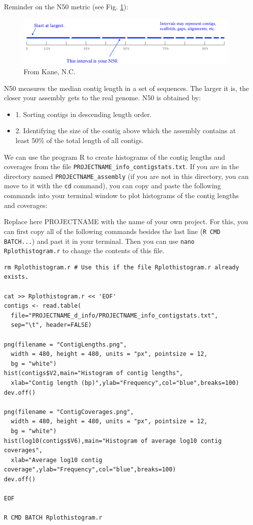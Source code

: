 \documentclass[11pt]{article}
\begin{document}
Reminder on the N50 metric (see Fig. \ref{fig:N50}):


\begin{figure}[htb]
\centering
\includegraphics[width=11cm]{N50.png}
\caption{\label{fig:N50}From Kane, N.C.}
\end{figure}


N50 measures the median contig length in a set of sequences. The
larger it is, the closer your assembly gets to the real genome. N50 is
obtained by:
\begin{itemize}
\item 1. Sorting contigs in descending length order.
\item 2. Identifying the size of the contig above which the assembly contains at least 50\% of the
total length of all contigs.
\end{itemize}


We can use the program R to create histograms of the contig lengths
and coverages from the file
\texttt{PROJECTNAME\_info\_contigstats.txt}. If you are in the
directory named \texttt{PROJECTNAME\_assembly} (if you are not in
this directory, you can move to it with the \texttt{cd} command), you can
copy and paste the following commands into your terminal window to
plot histograms of the contig lengths and coverages:

Replace here PROJECTNAME with the name of your own project. For this,
you can first copy all of the following commands besides the last line
(\texttt{R CMD BATCH...}) and past it in your terminal. Then you can use
\texttt{nano Rplothistogram.r} to change the contents of this file.

\begin{verbatim}
rm Rplothistogram.r # Use this if the file Rplothistogram.r already exists.

cat >> Rplothistogram.r << 'EOF'
contigs <- read.table(
  file="PROJECTNAME_d_info/PROJECTNAME_info_contigstats.txt", 
  sep="\t", header=FALSE)

png(filename = "ContigLengths.png",
  width = 480, height = 480, units = "px", pointsize = 12,
  bg = "white")
hist(contigs$V2,main="Histogram of contig lengths",
  xlab="Contig length (bp)",ylab="Frequency",col="blue",breaks=100)
dev.off()

png(filename = "ContigCoverages.png",
  width = 480, height = 480, units = "px", pointsize = 12,
  bg = "white")
hist(log10(contigs$V6),main="Histogram of average log10 contig coverages",
  xlab="Average log10 contig coverage",ylab="Frequency",col="blue",breaks=100)
dev.off()

EOF

R CMD BATCH Rplothistogram.r
\end{verbatim}
\end{document}
